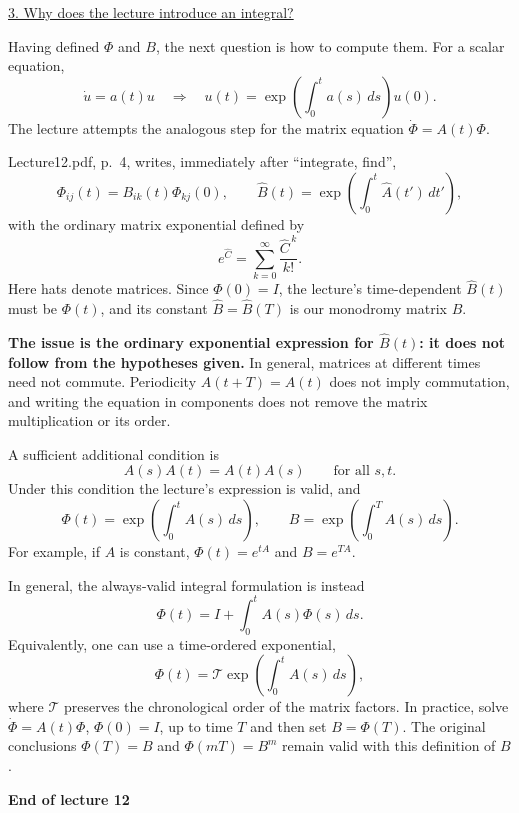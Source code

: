 \documentclass[11pt,a4paper]{article}
\begin{document}
\newpage
\noindent\underline{3. Why does the lecture introduce an integral?}

\medskip
\noindent Having defined $\Phi$ and $B$, the next question is how to
compute them. For a scalar equation,
\[
\dot u=a(t)u
\quad\Longrightarrow\quad
u(t)=\exp\!\left(\int_0^t a(s)\,ds\right)u(0).
\]
The lecture attempts the analogous step for the matrix equation
$\dot\Phi=A(t)\Phi$.

\medskip
\noindent\textcolor{red!70!black}{}

\medskip
\noindent Lecture12.pdf, p.~4, writes, immediately after ``integrate,
find'',
\[
\Phi_{ij}(t)=B_{ik}(t)\Phi_{kj}(0),\qquad
\widehat B(t)=\exp\!\left(\int_0^t\widehat A(t')\,dt'\right),
\]
with the ordinary matrix exponential defined by
\[
e^{\widehat C}=\sum_{k=0}^{\infty}\frac{\widehat C^{\,k}}{k!}.
\]
Here hats denote matrices. Since $\Phi(0)=I$, the lecture's time-dependent
$\widehat B(t)$ must be $\Phi(t)$, and its constant $\widehat B=\widehat B(T)$
is our monodromy matrix $B$.

\medskip
\noindent\textbf{The issue is the ordinary exponential expression for
$\widehat B(t)$: it does not follow from the hypotheses given.}
In general, matrices at different times need not commute. Periodicity
$A(t+T)=A(t)$ does not imply commutation, and writing the equation in
components does not remove the matrix multiplication or its order.

\medskip
\noindent A sufficient additional condition is
\[
A(s)A(t)=A(t)A(s)\qquad\text{for all }s,t.
\]
Under this condition the lecture's expression is valid, and
\[
\Phi(t)=\exp\!\left(\int_0^t A(s)\,ds\right),\qquad
B=\exp\!\left(\int_0^T A(s)\,ds\right).
\]
For example, if $A$ is constant, $\Phi(t)=e^{tA}$ and $B=e^{TA}$.

\medskip
\noindent In general, the always-valid integral formulation is instead
\[
\boxed{\Phi(t)=I+\int_0^t A(s)\Phi(s)\,ds}.
\]
Equivalently, one can use a time-ordered exponential,
\[
\Phi(t)=\mathcal T\exp\!\left(\int_0^t A(s)\,ds\right),
\]
where $\mathcal T$ preserves the chronological order of the matrix factors.
In practice, solve $\dot\Phi=A(t)\Phi$, $\Phi(0)=I$, up to time $T$ and
then set $B=\Phi(T)$. The original conclusions $\Phi(T)=B$ and
$\Phi(mT)=B^m$ remain valid with this definition of $B$.

\begin{center}
\textbf{End of lecture 12}
\end{center}
\end{document}
